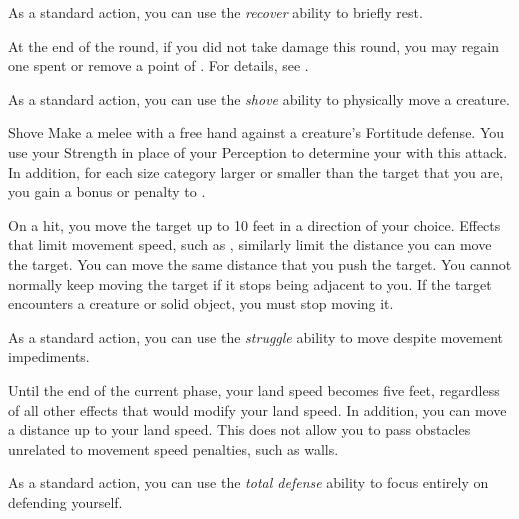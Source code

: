          As a standard action, you can use the \textit{recover} ability to briefly rest.

        \begin{freeability}{}
            At the end of the round, if you did not take damage this round, you may regain one spent  or remove a point of .
            For details, see .
        \end{freeability}

         As a standard action, you can use the \textit{shove} ability to physically move a creature.

        \begin{freeability}{Shove}\label{Shove}
            Make a melee  with a free hand against a creature's Fortitude defense.
            You use your Strength in place of your Perception to determine your  with this attack.
            In addition, for each size category larger or smaller than the target that you are, you gain a  bonus or penalty to .

            On a hit, you move the target up to 10 feet in a direction of your choice.
            Effects that limit movement speed, such as , similarly limit the distance you can move the target.
            You can move the same distance that you push the target.
            You cannot normally keep moving the target if it stops being adjacent to you.
            If the target encounters a creature or solid object, you must stop moving it.
        \end{freeability}

         As a standard action, you can use the \textit{struggle} ability to move despite movement impediments.

        \begin{freeability}{}
            Until the end of the current phase, your land speed becomes five feet, regardless of all other effects that would modify your land speed.
            In addition, you can move a distance up to your land speed.
            This does not allow you to pass obstacles unrelated to movement speed penalties, such as walls.
        \end{freeability}

         As a standard action, you can use the \textit{total defense} ability to focus entirely on defending yourself.

